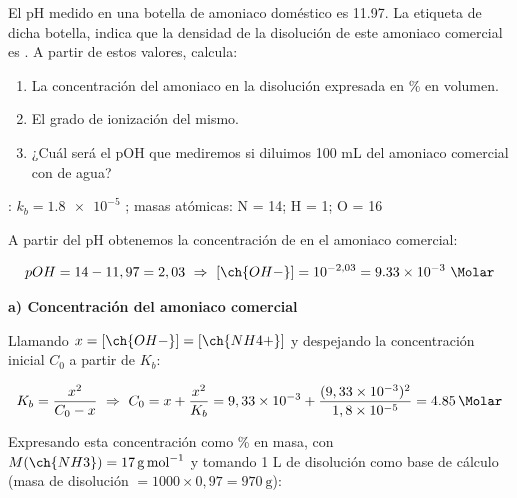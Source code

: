 \begin{exerciseEVAU}
    El pH medido en una botella de amoniaco doméstico es \num{11.97}. La etiqueta de dicha botella, indica que la densidad de la disolución de este amoniaco comercial es  . A partir de estos valores, calcula:
    \begin{enumerate}[label=\letraminuscula]
        \item La concentración del amoniaco en la disolución expresada en \% en volumen.
        \item El grado de ionización del mismo.
        \item ¿Cuál será el pOH que mediremos si diluimos 100 mL del amoniaco comercial con de agua?
    \end{enumerate}
    \datos{}: \(k_b = \num{1.8e-5}\) ; masas atómicas: N = 14; H = 1; O = 16



    \begin{solu}


        A partir del pH obtenemos la concentración de  en el amoniaco comercial:

        \begin{equation*}
            pOH = 14 - 11,97 = 2,03 \ \Rightarrow \ [\ch{OH-}] = 10^{-2,03} = \num{9.33e-3} \ \si{\Molar}
        \end{equation*}

        \textbf{a) Concentración del amoniaco comercial}

        Llamando \(x = [\ch{OH-}] = [\ch{NH4+}]\) y despejando la concentración inicial \(C_0\) a partir de \(K_b\):

        \begin{equation*}
            K_b = \dfrac{x^2}{C_0-x} \ \Rightarrow \ C_0 = x + \dfrac{x^2}{K_b} = 9,33\times10^{-3} + \dfrac{(9,33\times10^{-3})^2}{1,8\times10^{-5}} = \SI{4.85}{\Molar}
        \end{equation*}

        Expresando esta concentración como \% en masa, con \(M(\ch{NH3}) = \SI{17}{\gram\per\mole}\) y tomando 1 L de disolución como base de cálculo (masa de disolución \(= 1000 \times 0,97 = \SI{970}{\gram}\)):


\end{solu}
\end{exerciseEVAU}

